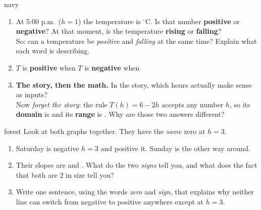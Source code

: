 \documentclass[10pt]{article}
\begin{document}
\begin{scenariobox}{navy}
\begin{enumerate}[label=\textbf{\alph*.}, start=3, leftmargin=1.8em, itemsep=5pt]
  \item At 5:00 p.m.\ ($h=1$) the temperature is  $^\circ$C. Is that number
        \textbf{positive} or \textbf{negative}?  \; At that moment, is the
        temperature \textbf{rising} or \textbf{falling}?  \\[3pt]
        So: can a temperature be \emph{positive} and \emph{falling} at the same time? Explain what
        each word is describing.
  \item $T$ is \textbf{positive} when  \qquad
        $T$ is \textbf{negative} when 
  \item \textbf{The story, then the math.} In the story, which hours actually make sense as inputs?
         \\[3pt]
        Now \emph{forget the story}: the rule $T(h)=6-2h$ accepts any number $h$, so its
        \textbf{domain} is  and its \textbf{range} is .
        Why are those two answers different?
\end{enumerate}
\end{scenariobox}

\boxguard[16]
\begin{scenariobox}{forest}
Look at both graphs together. They have the \emph{same} zero at $h=3$.
\begin{enumerate}[label=\textbf{\alph*.}, leftmargin=1.8em, itemsep=5pt]
  \item Saturday is negative  $h=3$ and positive  it.
        Sunday is the other way around.
  \item Their slopes are  and . What do the two \emph{signs} tell
        you, and what does the fact that both are $2$ in size tell you?
  \item Write one sentence, using the words \emph{zero} and \emph{sign}, that explains why neither
        line can switch from negative to positive anywhere except at $h=3$.
\end{enumerate}
\end{scenariobox}
\end{document}
